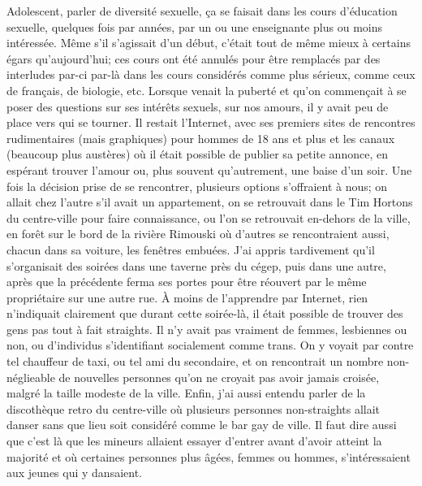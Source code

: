 Adolescent, parler de diversité sexuelle, ça se faisait dans les cours d'éducation sexuelle, quelques fois par années, par un ou une enseignante plus ou moins intéressée.
Même s'il s'agissait d'un début, c'était tout de même mieux à certains égars qu'aujourd'hui; ces cours ont été annulés pour être remplacés par des interludes par-ci par-là dans les cours considérés comme plus sérieux, comme ceux de français, de biologie, etc.
Lorsque venait la puberté et qu'on commençait à se poser des questions sur ses intérêts sexuels, sur nos amours, il y avait peu de place vers qui se tourner.
Il restait l'Internet, avec ses premiers sites de rencontres rudimentaires (mais graphiques) pour hommes de 18 ans et plus et les canaux \irc{} (beaucoup plus austères) où il était possible de publier sa petite annonce, en espérant trouver l'amour ou, plus souvent qu'autrement, une baise d'un soir.
Une fois la décision prise de se rencontrer, plusieurs options s'offraient à nous; on allait chez l'autre s'il avait un appartement, on se retrouvait dans le Tim Hortons du centre-ville pour faire connaissance, ou l'on se retrouvait en-dehors de la ville, en forêt sur le bord de la rivière Rimouski où d'autres se rencontraient aussi, chacun dans sa voiture, les fenêtres embuées.
J'ai appris tardivement qu'il s'organisait des soirées dans une taverne près du cégep, puis dans une autre, après que la précédente ferma ses portes pour être réouvert par le même propriétaire sur une autre rue.
À moins de l'apprendre par Internet, rien n'indiquait clairement que durant cette soirée-là, il était possible de trouver des gens pas tout à fait straights.
Il n'y avait pas vraiment de femmes, lesbiennes ou non, ou d'individus s'identifiant socialement comme trans.
On y voyait par contre tel chauffeur de taxi, ou tel ami du secondaire, et on rencontrait un nombre non-néglieable de nouvelles personnes qu'on ne croyait pas avoir jamais croisée, malgré la taille modeste de la ville.
Enfin, j'ai aussi entendu parler de la discothèque retro du centre-ville où plusieurs personnes non-straights allait danser sans que lieu soit considéré comme le bar gay de ville.
Il faut dire aussi que c'est là que les mineurs allaient essayer d'entrer avant d'avoir atteint la majorité et où certaines personnes plus âgées, femmes ou hommes, s'intéressaient aux jeunes qui y dansaient.

